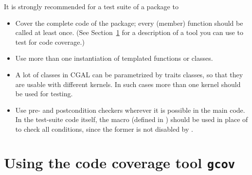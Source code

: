It is strongly recommended for a test suite of a package to
\begin {itemize}
\item Cover the complete code of the package; every (member) function
      should be called at least once. (See Section~\ref{sec:gcov} for
      a description of a tool you can use to test for code coverage.)
\item Use more than one instantiation of templated functions or classes.
\item A lot of classes in CGAL can be parametrized by traits classes, so 
      that they are usable with different kernels. In such cases more than one
      kernel should be used for testing.
\item Use pre- and postcondition checkers wherever it is possible in the
      main code.  In the test-suite code itself, the macro 
      (defined in ) should be used in place of
       to check all conditions, since the former is not disabled by
      . 
\end {itemize}

\section{Using the code coverage tool \texttt{gcov}}
\label{sec:gcov}

